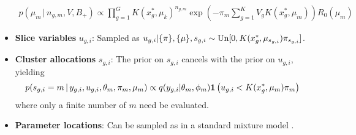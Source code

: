 \begin{itemize}
    \begin{align}
      p(\mu_m \, | \, n_{g,m}, V, B_+) \propto \prod_{g=1}^G K(x^*_g,\mu_k)^{n_{g,m}} \exp \left ( -\pi_m
      \sum_{g=1}^K V_g K(x^*_g,\mu_m) \right ) R_0(\mu_m)
      \label{eqn:postmu}
    \end{align}
  \item \textbf{Slice variables} $u_{g,i}$: Sampled as 
    $u_{g,i}  | \{\pi\}, \{\mu\}, s_{g,i} \sim \text{Un}[0, K(x^*_g, \mu_{s_{g,i}})
    \pi_{s_{g,i}}]$. %
  \item \textbf{Cluster allocations} $s_{g,i}$: The prior on $s_{g,i}$ cancels with
    the prior on $u_{g,i}$, yielding
  \begin{equation}
    p(s_{g,i} = m \, | \, y_{g,i}, u_{g,i}, \theta_m, \pi_m, \mu_m) \propto
        q(y_{g,i}|\theta_m,\phi_m) \mathbf 1 \left ( u_{g,i} < K(x^*_g,\mu_m)\pi_m \right )
        \label{eqn:post_s}
      \end{equation}
      where only a finite number of $m$ need be evaluated.

  \item \textbf{Parameter locations}: Can be sampled as in a standard mixture 
    model \cite{GriffinWalker:2011}.
\end{itemize}

